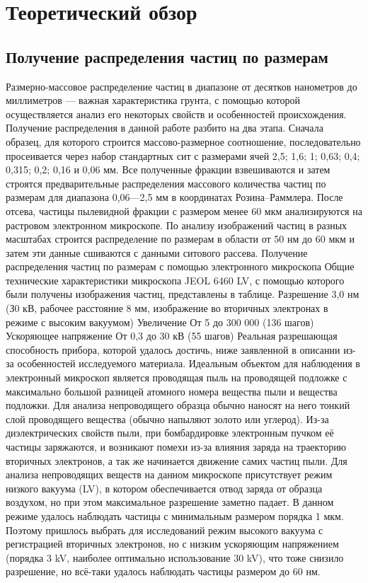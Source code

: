 \chapter{Теоретический обзор} \label{chapt1}

\section{Получение распределения частиц по размерам} \label{sect1_1}


Размерно-массовое распределение частиц в диапазоне от десятков нанометров до миллиметров — важная характеристика грунта, с помощью которой осуществляется анализ его некоторых свойств и особенностей происхождения.
Получение распределения в данной работе разбито на два этапа. 
Сначала образец, для которого строится массово-размерное соотношение, последовательно просеивается через набор стандартных сит с размерами ячей 2,5; 1,6; 1; 0,63; 0,4; 0,315; 0,2; 0,16 и 0,06 мм. Все полученные фракции взвешиваются и затем строятся предварительные распределения массового количества частиц по размерам для диапазона 0,06—2,5 мм в координатах Розина–Раммлера.
После отсева, частицы пылевидной фракции с размером менее 60 мкм анализируются на растровом электронном микроскопе. По анализу изображений частиц в разных масштабах строится распределение по размерам в области от 50 нм до 60 мкм и затем эти данные сшиваются с данными ситового рассева.
Получение распределения частиц по размерам с помощью электронного микроскопа
Общие технические характеристики микроскопа JEOL 6460 LV, с помощью которого были получены изображения частиц, представлены в таблице.
Разрешение	3,0 нм (З0 кВ, рабочее расстояние 8 мм, изображение во вторичных электронах в режиме с высоким вакуумом)
Увеличение	От 5 до 300 000 (136 шагов)
Ускоряющее напряжение	От 0,3 до 30 кВ (55 шагов)
Реальная разрешающая способность прибора, которой удалось достичь, ниже заявленной в описании из-за особенностей исследуемого материала. Идеальным объектом для наблюдения в электронный микроскоп является проводящая пыль на проводящей подложке с максимально большой разницей атомного номера вещества пыли и вещества подложки. Для анализа непроводящего образца обычно наносят на него тонкий слой проводящего вещества (обычно напыляют золото или углерод). Из-за диэлектрических свойств пыли, при бомбардировке электронным пучком её частицы заряжаются, и возникают помехи из-за влияния заряда на траекторию вторичных электронов, а так же начинается движение самих частиц пыли. Для анализа непроводящих веществ на данном микроскопе присутствует режим низкого вакуума (LV), в котором обеспечивается отвод заряда от образца воздухом, но при этом максимальное разрешение заметно падает. В данном режиме удалось наблюдать частицы с минимальным размером порядка 1 мкм. Поэтому пришлось выбрать для исследований режим высокого вакуума с регистрацией вторичных электронов, но с низким ускоряющим напряжением (порядка 3 kV, наиболее оптимально использование 30 kV), что тоже снизило разрешение, но всё-таки удалось наблюдать частицы размером до 60 нм.

